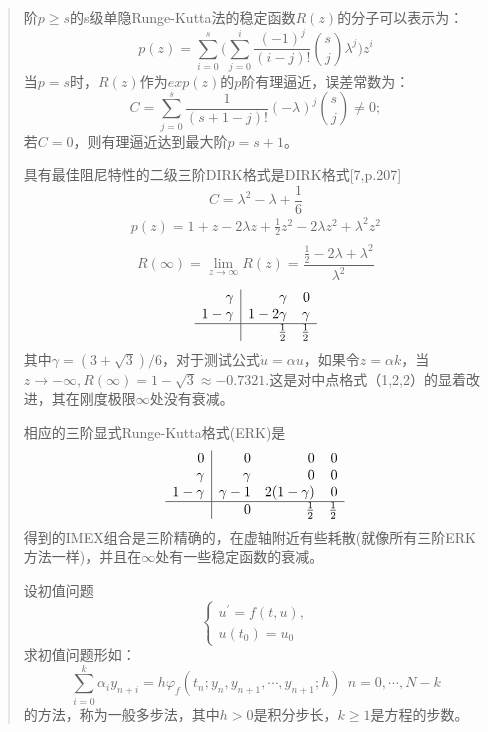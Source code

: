 \documentclass{article}
\begin{document}
\begin{CJK}{UTF8}{gkai}
\begin{quotation}
阶$p\ge s$的s级单隐Runge-Kutta法的稳定函数$R(z)$的分子可以表示为：
\begin{equation*}
p(z)=\sum_{i=0}^{s}\bigg(\sum_{j=0}^{i}\frac{(-1)^j}{(i-j)!}\binom{s}{j}\lambda^j\biggl)z^i
\end{equation*}
当$p=s$时，$R(z)$作为$exp(z)$的$p$阶有理逼近，误差常数为：
\begin{equation*}
C=\sum_{j=0}^{s}\frac{1}{(s+1-j)!}(-\lambda)^j\binom{s}{j}\ne 0;
\end{equation*}
若$C=0$，则有理逼近达到最大阶$p=s+1$。

具有最佳阻尼特性的二级三阶DIRK格式是DIRK格式[7,p.207]
\begin{equation*}
C=\lambda^2-\lambda+\frac{1}{6}
\end{equation*}
\begin{gather*}
p(z)=1+z-2\lambda z+\frac{1}{2}z^2-2\lambda z^2+\lambda^2z^2\\
\end{gather*}
\begin{equation*}
R(\infty)=\lim\limits_{z\to \infty}R(z)=\frac{\frac{1}{2}-2\lambda+\lambda^2}{\lambda^2}
\end{equation*}
\[
\begin{array}{r|rr}
\gamma & \gamma & 0 \\
1-\gamma & 1-2\gamma & \gamma  \\
\hline
& \frac{1}{2} & \frac{1}{2}
\end{array}
\]
其中$\gamma=(3+\sqrt{3})/6$，对于测试公式$\dot{u}=\alpha u$，如果令$z=\alpha k$，当$z\to -\infty,R(\infty)=1-\sqrt{3}\approx -0.7321.$这是对中点格式（1,2,2）的显着改进，其在刚度极限$\infty$处没有衰减。

相应的三阶显式Runge-Kutta格式(ERK)是
\[
\begin{array}{r|rrr}
0 & 0 & 0 & 0\\
\gamma & \gamma & 0 & 0\\
1-\gamma & \gamma -1 & 2(1-\gamma ) & 0\\
\hline
& 0 & \frac{1}{2} & \frac{1}{2}
\end{array}
\]
得到的IMEX组合是三阶精确的，在虚轴附近有些耗散(就像所有三阶ERK方法一样)，并且在$\infty$处有一些稳定函数的衰减。

设初值问题
\begin{equation*}
\begin{cases}
u^{'}=f(t,u),\\
u(t_{0})=u_{0}
\end{cases}
\end{equation*}
求初值问题形如：
\begin{equation}
\sum_{i=0}^{k}\alpha_{i}y_{n+i}=h\varphi_{f}(t_{n};y_{n},y_{n+1},\cdots,y_{n+1};h)~~n=0,\cdots,N-k
\label{27}
\end{equation}
的方法，称为一般多步法，其中$h>0$是积分步长，$k\ge 1$是方程的步数。


\end{quotation}
\end{CJK}
\end{document}
